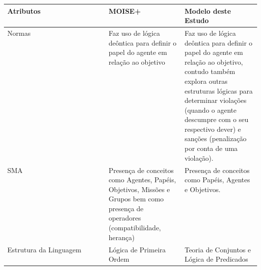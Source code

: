 \begin{table}[H]
\centering
\begin{tabular}{|l|p{0.3\linewidth}|p{0.3\linewidth}|}
\hline			
\textbf{Atributos}
& 
\textbf{MOISE+}  
& 
\textbf{Modelo deste Estudo} 

\\ \hline		 
Normas    
& 
Faz uso de lógica deôntica para definir o papel do agente em relação ao objetivo 
& 
Faz uso de lógica deôntica para definir o papel do agente em relação ao objetivo, contudo também explora outras estruturas lógicas para determinar violações (quando o agente descumpre com o seu respectivo dever) e sanções (penalização por conta de uma violação).  

\\ \hline
SMA        		
& 
Presença de conceitos como Agentes, Papéis, Objetivos, Missões e Grupos bem como presença de  operadores (compatibilidade, herança)  
& 
Presença de conceitos como Papéis, Agentes e Objetivos. 

\\ \hline
Estrutura da Linguagem
& 
Lógica de Primeira Ordem 
&
Teoria de Conjuntos e Lógica de Predicados

\\ \hline
\end{tabular}
\end{table}

